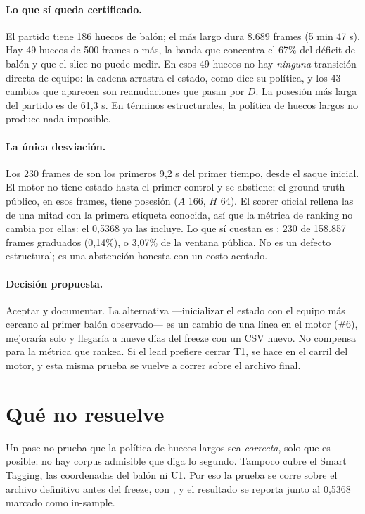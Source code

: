 \documentclass[11pt,a4paper]{article}
\newcommand{\code}[1]{\texttt{\detokenize{#1}}}
\begin{document}
\paragraph{Lo que s\'i queda certificado.} El partido tiene 186 huecos de bal\'on; el m\'as largo
dura 8.689 frames (5 min 47 s). Hay 49 huecos de 500 frames o m\'as, la banda que concentra el 67\%
del d\'eficit de bal\'on y que el slice no puede medir. En esos 49 huecos no hay \emph{ninguna}
transici\'on directa de equipo: la cadena arrastra el estado, como dice su pol\'itica, y los 43
cambios que aparecen son reanudaciones que pasan por $D$. La posesi\'on m\'as larga del partido es
de 61,3 s. En t\'erminos estructurales, la pol\'itica de huecos largos no produce nada imposible.

\paragraph{La \'unica desviaci\'on.} Los 230 frames de \code{X} son los primeros 9,2 s del primer
tiempo, desde el saque inicial. El motor no tiene estado hasta el primer control y se abstiene; el
ground truth p\'ublico, en esos frames, tiene posesi\'on ($A$ 166, $H$ 64). El scorer oficial
rellena las \code{X} de una mitad con la primera etiqueta conocida, as\'i que la m\'etrica de
ranking no cambia por ellas: el 0,5368 ya las incluye. Lo que s\'i cuestan es \code{macroF1}:
230 de 158.857 frames graduados (0,14\%), o 3,07\% de la ventana p\'ublica. No es un defecto
estructural; es una abstenci\'on honesta con un costo acotado.

\paragraph{Decisi\'on propuesta.} Aceptar y documentar. La alternativa ---inicializar el estado con
el equipo m\'as cercano al primer bal\'on observado--- es un cambio de una l\'inea en el motor
(\#6), mejorar\'ia solo \code{macroF1} y llegar\'ia a nueve d\'ias del freeze con un CSV nuevo. No
compensa para la m\'etrica que rankea. Si el lead prefiere cerrar T1, se hace en el carril del
motor, y esta misma prueba se vuelve a correr sobre el archivo final.

\section{Qu\'e no resuelve}

Un pase no prueba que la pol\'itica de huecos largos sea \emph{correcta}, solo que es posible: no
hay corpus admisible que diga lo segundo. Tampoco cubre el Smart Tagging, las coordenadas del
bal\'on ni U1. Por eso la prueba se corre sobre el archivo definitivo antes del freeze, con
\code{make contract-audit}, y el resultado se reporta junto al 0,5368 marcado como in-sample.
\end{document}

